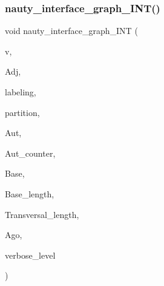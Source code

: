 \subsubsection{\texorpdfstring{nauty\+\_\+interface\+\_\+graph\+\_\+\+I\+N\+T()}{nauty\_interface\_graph\_INT()}}
{\footnotesize\ttfamily void nauty\+\_\+interface\+\_\+graph\+\_\+\+I\+NT (\begin{DoxyParamCaption}\item[{\mbox{\hyperlink{galois_8h_a09fddde158a3a20bd2dcadb609de11dc}{I\+NT}}}]{v,  }\item[{\mbox{\hyperlink{galois_8h_a09fddde158a3a20bd2dcadb609de11dc}{I\+NT}} $\ast$}]{Adj,  }\item[{\mbox{\hyperlink{galois_8h_a09fddde158a3a20bd2dcadb609de11dc}{I\+NT}} $\ast$}]{labeling,  }\item[{\mbox{\hyperlink{galois_8h_a09fddde158a3a20bd2dcadb609de11dc}{I\+NT}} $\ast$}]{partition,  }\item[{\mbox{\hyperlink{galois_8h_a09fddde158a3a20bd2dcadb609de11dc}{I\+NT}} $\ast$}]{Aut,  }\item[{\mbox{\hyperlink{galois_8h_a09fddde158a3a20bd2dcadb609de11dc}{I\+NT}} \&}]{Aut\+\_\+counter,  }\item[{\mbox{\hyperlink{galois_8h_a09fddde158a3a20bd2dcadb609de11dc}{I\+NT}} $\ast$}]{Base,  }\item[{\mbox{\hyperlink{galois_8h_a09fddde158a3a20bd2dcadb609de11dc}{I\+NT}} \&}]{Base\+\_\+length,  }\item[{\mbox{\hyperlink{galois_8h_a09fddde158a3a20bd2dcadb609de11dc}{I\+NT}} $\ast$}]{Transversal\+\_\+length,  }\item[{\mbox{\hyperlink{galois_8h_a09fddde158a3a20bd2dcadb609de11dc}{I\+NT}} \&}]{Ago,  }\item[{\mbox{\hyperlink{galois_8h_a09fddde158a3a20bd2dcadb609de11dc}{I\+NT}}}]{verbose\+\_\+level }\end{DoxyParamCaption})}

\mbox{\label{nauty__interface_8_c_ad05f3e3dbad8908ea53a8fa4904682ad}} 
